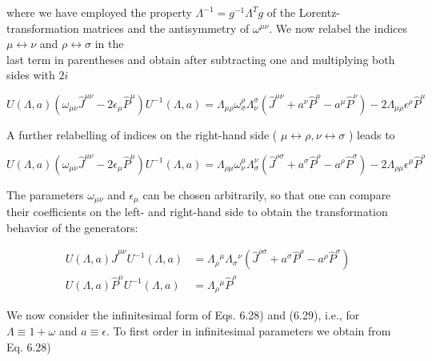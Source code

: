 \documentclass[10pt, letterpaper]{article}
\begin{document}
where we have employed the property $\Lambda^{-1}=g^{-1} \Lambda^{T} g$ of the Lorentz-transformation matrices and the antisymmetry of $\omega^{\mu \nu}$. We now relabel the indices $\mu \leftrightarrow \nu$ and $\rho \leftrightarrow \sigma$ in the\\
last term in parentheses and obtain after subtracting one and multiplying both sides with $2 i$

$$
U(\Lambda, a)\left(\omega_{\mu \nu} \hat{J}^{\mu \nu}-2 \epsilon_{\mu} \hat{P}^{\mu}\right) U^{-1}(\Lambda, a)=\Lambda_{\mu \rho} \omega_{\sigma}^{\rho} \Lambda_{\nu}^{\sigma}\left(\hat{J}^{\mu \nu}+a^{\nu} \hat{P}^{\mu}-a^{\mu} \hat{P}^{\nu}\right)-2 \Lambda_{\mu \rho} \epsilon^{\rho} \hat{P}^{\mu}
$$

A further relabelling of indices on the right-hand side ( $\mu \leftrightarrow \rho, \nu \leftrightarrow \sigma$ ) leads to

$$
U(\Lambda, a)\left(\omega_{\mu \nu} \hat{J}^{\mu \nu}-2 \epsilon_{\mu} \hat{P}^{\mu}\right) U^{-1}(\Lambda, a)=\Lambda_{\rho \mu} \omega_{\nu}^{\mu} \Lambda_{\sigma}^{\nu}\left(\hat{J}^{\rho \sigma}+a^{\sigma} \hat{P}^{\rho}-a^{\rho} \hat{P}^{\sigma}\right)-2 \Lambda_{\rho \mu} \epsilon^{\mu} \hat{P}^{\rho}
$$

The parameters $\omega_{\mu \nu}$ and $\epsilon_{\mu}$ can be chosen arbitrarily, so that one can compare their coefficients on the left- and right-hand side to obtain the transformation behavior of the generators:

$$
\begin{aligned}
U(\Lambda, a) \hat{J}^{\mu \nu} U^{-1}(\Lambda, a) & =\Lambda_{\rho}{ }^{\mu} \Lambda_{\sigma}{ }^{\nu}\left(\hat{J}^{\rho \sigma}+a^{\sigma} \hat{P}^{\rho}-a^{\rho} \hat{P}^{\sigma}\right) \\
U(\Lambda, a) \hat{P}^{\mu} U^{-1}(\Lambda, a) & =\Lambda_{\rho}{ }^{\mu} \hat{P}^{\rho}
\end{aligned}
$$

We now consider the infinitesimal form of Eqs. 6.28) and (6.29), i.e., for $\Lambda \equiv 1+\omega$ and $a \equiv \epsilon$. To first order in infinitesimal parameters we obtain from Eq. 6.28)
\end{document}
